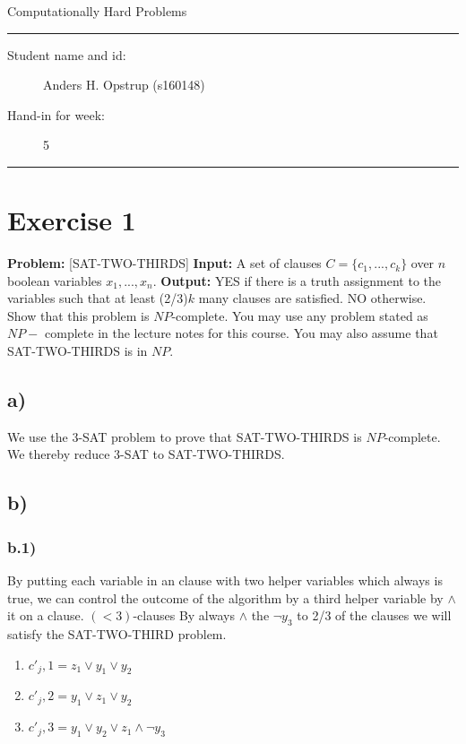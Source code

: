 \documentclass[11pt]{article}
\begin{document}
\begin{center}
{{\Large \sc Computationally Hard Problems}}
\end{center}
\rule{\textwidth}{1pt}
\begin{description}
\item[Student name and id:] Anders H. Opstrup (s160148)
\item[Hand-in for week:] 5
\end{description}
\rule{\textwidth}{1pt}

\section*{Exercise 1}
\textbf{Problem:} [SAT-TWO-THIRDS] \newline
\textbf{Input:} A set of clauses $C = \{c_{1}, ... ,c_{k}\}$ over $n$ boolean variables $x_{1}, ... ,x_{n}$. \newline
\textbf{Output:} YES if there is a truth assignment to the variables such that at least (2/3)$k$ many clauses are satisfied. NO otherwise. \newline \newline
Show that this problem is $NP$-complete. You may use any problem stated as $NP-$ complete in the lecture notes for this course. You may also assume that SAT-TWO-THIRDS is in $NP$.

\subsection*{a)}
We  use the 3-SAT problem to prove that SAT-TWO-THIRDS is $NP$-complete. We thereby reduce 3-SAT to SAT-TWO-THIRDS.

\subsection*{b)}

\subsubsection*{b.1)}
By putting each variable in an clause with two helper variables which always is true, we can control the outcome of the algorithm by a third helper variable by $\land$ it on a clause. \newline \newline
$(< 3)$-clauses
By always $\land$ the $\neg y_{3}$ to 2/3 of the clauses we will satisfy the SAT-TWO-THIRD problem.
\begin{enumerate}
\item $c'_{j},1 = z_{1} \vee y_{1} \vee y_{2} $
\item $c'_{j},2 = y_{1} \vee z_{1} \vee y_{2} $
\item $c'_{j},3 = y_{1} \vee y_{2} \vee z_{1} \land \neg y_{3} $
\end{enumerate}
\end{document}
